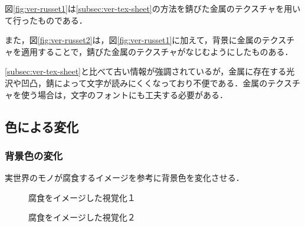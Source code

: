 図\ref{fig:ver-russet1}は\ref{subsec:ver-tex-sheet}の方法を錆びた金属のテクスチャを用いて行ったものである．

また，図\ref{fig:ver-russet2}は，図\ref{fig:ver-russet1}に加えて，背景に金属のテクスチャを適用することで，錆びた金属のテクスチャがなじむようにしたものある．

\ref{subsec:ver-tex-sheet}と比べて古い情報が強調されているが，金属に存在する光沢や凹凸，錆によって文字が読みにくくなっており不便である．金属のテクスチャを使う場合は，文字のフォントにも工夫する必要がある．

\subsection{色による変化}
\label{sec:ver-color}

\subsubsection{背景色の変化}
\label{subsec:ver-col-cor}

実世界のモノが腐食するイメージを参考に背景色を変化させる．

\begin{figure}[htbp]
  \begin{minipage}{0.5\hsize}
    \begin{center}
    \end{center}
    \caption{腐食をイメージした視覚化１}
    \label{fig:ver-corrosion1}
  \end{minipage}
  \begin{minipage}{0.5\hsize}
    \begin{center}
    \end{center}
    \caption{腐食をイメージした視覚化２}
    \label{fig:ver-corrosion2}
  \end{minipage}
\end{figure}

